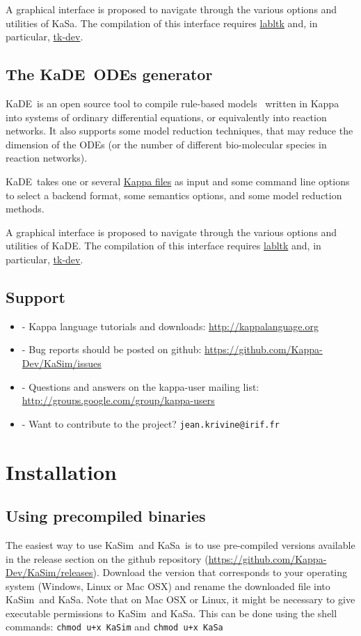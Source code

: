 \documentclass[11pt]{book}
\def\KaSim{\textsf{KaSim}}
\def\KaSa{\textsf{KaSa}}
\def\KaDE{\textsf{KaDE}}
\def\ttt#1{\texttt{#1}}
\def\ITE#1{\begin{itemize}#1\end{itemize}}
\begin{document}
A graphical interface is proposed to navigate through the various options and utilities  of \KaSa. The compilation of this interface requires \href{https://forge.ocamlcore.org/projects/labltk/}{labltk} and, in particular,  \href{http://www.tcl.tk/}{tk-dev}.

\section{The \KaDE~ODEs generator}

\KaDE~is an open source tool to compile rule-based models~\cite{DanLan04,Dan_etal07a,Fae_etal05} written in Kappa into systems of ordinary differential equations, or equivalently into reaction networks.
It also supports some model reduction techniques, that may reduce the
dimension of the ODEs (or the number of different bio-molecular species in reaction networks).

\KaDE~takes one or several \hyperref[chap:kappa]{Kappa files} as input and some command line options to select a backend format, some semantics options, and some model reduction methods.

A graphical interface is proposed to navigate through the various options and utilities  of \KaDE. The compilation of this interface requires \href{https://forge.ocamlcore.org/projects/labltk/}{labltk} and, in particular,  \href{http://www.tcl.tk/}{tk-dev}.


\section{Support}
\ITE{
\item[-] Kappa language tutorials and downloads: \url{http://kappalanguage.org}
\item[-] Bug reports should be posted on github: \url{https://github.com/Kappa-Dev/KaSim/issues}
\item[-] Questions and answers on the kappa-user mailing list: \url{http://groups.google.com/group/kappa-users}
\item[-] Want to contribute to the project? \ttt{jean.krivine@irif.fr}
}

\chapter{Installation}\label{chap:install}

\section{Using precompiled binaries}
The easiest way to use \KaSim~and \KaSa~is to use pre-compiled versions available in the release section on the github repository (\url{https://github.com/Kappa-Dev/KaSim/releases}). Download the version that corresponds to your operating system (Windows, Linux or Mac OSX) and rename the downloaded file into \KaSim~and \KaSa. Note that on Mac OSX or Linux, it might be necessary to give executable permissions to \KaSim~and \KaSa. This can be done using the shell commands:
\ttt{chmod u+x KaSim} and \ttt{chmod u+x KaSa}
\end{document}
